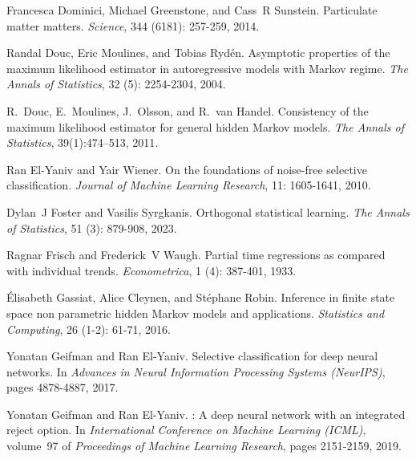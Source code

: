 Francesca Dominici, Michael Greenstone, and Cass~R Sunstein.
\newblock Particulate matter matters.
\newblock \emph{Science}, 344 (6181): 257-259, 2014.

Randal Douc, Eric Moulines, and Tobias Ryd{\'e}n.
\newblock Asymptotic properties of the maximum likelihood estimator in autoregressive models with {M}arkov regime.
\newblock \emph{The Annals of Statistics}, 32 (5): 2254-2304, 2004.

R.~Douc, E.~Moulines, J.~Olsson, and R.~van Handel.
\newblock Consistency of the maximum likelihood estimator for general hidden Markov models.
\newblock \emph{The Annals of Statistics}, 39(1):474--513, 2011.

Ran El-Yaniv and Yair Wiener.
\newblock On the foundations of noise-free selective classification.
\newblock \emph{Journal of Machine Learning Research}, 11: 1605-1641, 2010.

Dylan~J Foster and Vasilis Syrgkanis.
\newblock Orthogonal statistical learning.
\newblock \emph{The Annals of Statistics}, 51 (3): 879-908, 2023.

Ragnar Frisch and Frederick~V Waugh.
\newblock Partial time regressions as compared with individual trends.
\newblock \emph{Econometrica}, 1 (4): 387-401, 1933.

{\'E}lisabeth Gassiat, Alice Cleynen, and St{\'e}phane Robin.
\newblock Inference in finite state space non parametric hidden {M}arkov models and applications.
\newblock \emph{Statistics and Computing}, 26 (1-2): 61-71, 2016.

Yonatan Geifman and Ran El-Yaniv.
\newblock Selective classification for deep neural networks.
\newblock In \emph{Advances in Neural Information Processing Systems (NeurIPS)}, pages 4878-4887, 2017.

Yonatan Geifman and Ran El-Yaniv.
: A deep neural network with an integrated reject option.
\newblock In \emph{International Conference on Machine Learning (ICML)}, volume~97 of \emph{Proceedings of Machine Learning Research}, pages 2151-2159, 2019.

